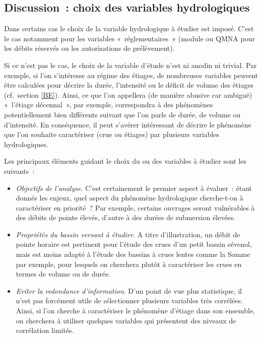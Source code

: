 \documentclass[
]{book}
\providecommand{\tightlist}{%
  \setlength{\itemsep}{0pt}\setlength{\parskip}{0pt}}
\begin{document}
\subsection{Discussion~: choix des variables hydrologiques}\label{discussion-choix-des-variables-hydrologiques}

Dans certains cas le choix de la variable hydrologique à étudier est imposé. C'est le cas notamment pour les variables «~réglementaires~» (module ou QMNA pour les débits réservés ou les autorisations de prélèvement).

Si ce n'est pas le cas, le choix de la variable d'étude n'est ni anodin ni trivial. Par exemple, si l'on s'intéresse au régime des étiages, de nombreuses variables peuvent être calculées pour décrire la durée, l'intensité ou le déficit de volume des étiages (cf.~section \ref{BE}). Ainsi, ce que l'on appellera (de manière abusive car ambiguë) «~l'étiage décennal~», par exemple, correspondra à des phénomènes potentiellement bien différents suivant que l'on parle de durée, de volume ou d'intensité. En conséquence, il peut s'avérer intéressant de décrire le phénomène que l'on souhaite caractériser (crue ou étiages) par plusieurs variables hydrologiques.

Les principaux éléments guidant le choix du ou des variables à étudier sont les suivants~:

\begin{itemize}
\tightlist
\item
  \emph{Objectifs de l'analyse}. C'est certainement le premier aspect à évaluer~: étant donnés les enjeux, quel aspect du phénomène hydrologique cherche-t-on à caractériser en priorité~? Par exemple, certains ouvrages seront vulnérables à des débits de pointe élevés, d'autre à des durées de submersion élevées.
\item
  \emph{Propriétés du bassin versant à étudier}. A titre d'illustration, un débit de pointe horaire est pertinent pour l'étude des crues d'un petit bassin cévenol, mais est moins adapté à l'étude des bassins à crues lentes comme la Somme par exemple, pour lesquels on cherchera plutôt à caractériser les crues en termes de volume ou de durée.
\item
  \emph{Eviter la redondance d'information}. D'un point de vue plus statistique, il n'est pas forcément utile de sélectionner plusieurs variables très corrélées. Ainsi, si l'on cherche à caractériser le phénomène d'étiage dans son ensemble, on cherchera à utiliser quelques variables qui présentent des niveaux de corrélation limités.
\end{itemize}
\end{document}
